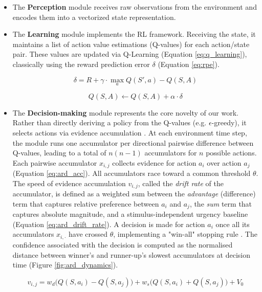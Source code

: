 \documentclass[runningheads]{llncs}
\begin{document}
\begin{itemize}
  \item The \textbf{Perception} module receives raw observations from the environment and encodes them into a vectorized state representation.
  \bigskip 
  \item The \textbf{Learning} module implements the RL framework. Receiving the state, it maintains a list of action value estimations (Q-values) for each action/state pair. These values are updated via Q-Learning (Equation \ref{eq:q_learning}), classically using the reward prediction error $\delta$ (Equation \ref{eq:rpe}).

\begin{equation}
\delta = R + \gamma \cdot \max_a Q(S',a) - Q(S,A)
\label{eq:rpe}
\end{equation}

\begin{equation}
Q(S,A) \leftarrow Q(S,A) + \alpha \cdot \delta
\label{eq:q_learning}
\end{equation}

  \bigskip 
  \item The \textbf{Decision-making} module represents the core novelty of our work. Rather than directly deriving a policy from the Q-values (e.g. $\epsilon$-greedy), it selects actions via  evidence accumulation \cite{mileticNewModelDecision2021}. At each environment time step, the module runs one accumulator per directional pairwise difference between Q-values, leading to a total of $n(n-1)$ accumulators for $n$ possible actions. Each pairwise accumulator $x_{i,j}$ collects evidence for action $a_i$ over action $a_j$ (Equation \ref{eq:ard_acc}). All accumulators race toward a common threshold $\theta$. The speed of evidence accumulation $v_{i,j}$, called the \textit{drift rate} of the accumulator, is defined as a weighted sum between the \textit{advantage} (difference) term that captures relative preference between $a_i$ and $a_j$, the \textit{sum} term that captures absolute magnitude, and a stimulus-independent urgency baseline (Equation \ref{eq:ard_drift_rate}). A decision is made for action $a_i$ once all its accumulators $x_{i,\cdot}$ have crossed $\theta$, implementing a "win-all" stopping rule \cite{vanravenzwaaijAccumulatingAdvantagesNew2020}. The confidence associated with the decision is computed as the normalised distance between winner's and runner-up's slowest accumulators at decision time (Figure \ref{fig:ard_dynamics}).

\begin{equation}
v_{i,j} = w_d\big(Q(S,a_i)-Q(S,a_j)\big) + w_s\big(Q(S,a_i)+Q(S,a_j)\big) + V_0
\label{eq:ard_drift_rate}
\end{equation}


\end{itemize}
\end{document}
